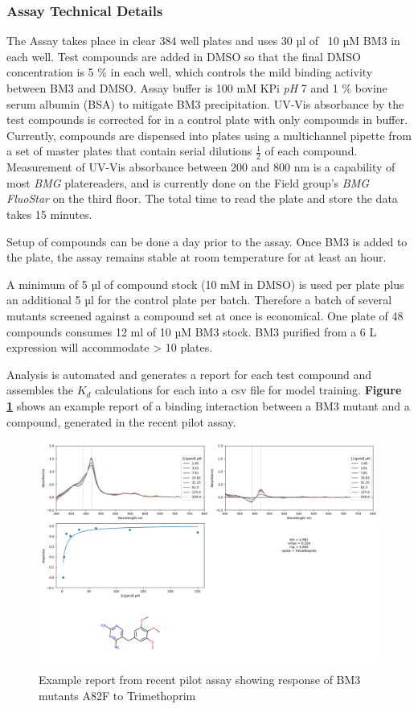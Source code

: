 \documentclass{article}
\begin{document}
\subsubsection{Assay Technical Details}
The Assay takes place in clear 384 well plates and uses 30 µl of ~10 µM BM3 in each well. %
Test compounds are added in DMSO so that the final DMSO concentration is 5 \% in each well, which controls the mild binding activity between BM3 and DMSO. %
Assay buffer is 100 mM KPi \textit{pH} 7 and 1 \% bovine serum albumin (BSA) to mitigate BM3 precipitation. %
UV-Vis absorbance by the test compounds is corrected for in a control plate with only compounds in buffer. %
Currently, compounds are dispensed into plates using a multichannel pipette from a set of master plates that contain serial dilutions $\frac{1}{2}$ of each compound. %
Measurement of UV-Vis absorbance between 200 and 800 nm is a capability of most \textit{BMG} platereaders, and is currently done on the Field group's \textit{BMG FluoStar} on the third floor. The total time to read the plate and store the data takes 15 minutes. %
\par
Setup of compounds can be done a day prior to the assay. Once BM3 is added to the plate, the assay remains stable at room temperature for at least an hour. %
\par
A minimum of 5 µl of compound stock (10 mM in DMSO) is used per plate plus an additional 5 µl for the control plate per batch. Therefore a batch of several mutants screened against a compound set at once is economical. %
One plate of 48 compounds consumes 12 ml of 10 µM BM3 stock. BM3 purified from a 6 L expression will accommodate > 10 plates. %
\par
Analysis is automated and generates a report for each test compound and assembles the $K_d$ calculations for each into a csv file for model training. %
\textbf{Figure \ref{pilot_report}} shows an example report of a binding interaction between a BM3 mutant and a compound, generated in the recent pilot assay.

\begin{figure}
	\includegraphics[width = \textwidth]{Trimethoprim.png}  %
	\caption{Example report from recent pilot assay showing response of BM3 mutants A82F to Trimethoprim \label{pilot_report}}
\end{figure}
\end{document}
